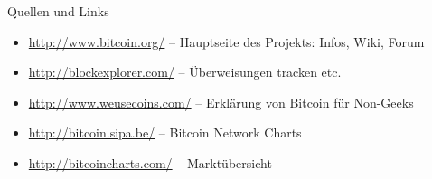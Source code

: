 \documentclass[handout]{beamer} \usepackage[german]{babel}
\begin{document}
\begin{frame}
	{Quellen und Links}
	\begin{itemize}
		\item \url{http://www.bitcoin.org/} -- Hauptseite des Projekts: Infos, Wiki, Forum                                      
		\item \url{http://blockexplorer.com/} -- Überweisungen tracken etc.                                                    
		\item \url{http://www.weusecoins.com/} -- Erklärung von Bitcoin für Non-Geeks                                          
		\item \url{http://bitcoin.sipa.be/} -- Bitcoin Network Charts                                                          
		\item \url{http://bitcoincharts.com/} -- Marktübersicht 
	\end{itemize}
\end{frame} 
\end{document}
